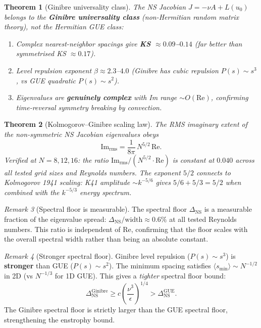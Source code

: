 \documentclass[11pt,a4paper]{article}
\theoremstyle{plain}
\newtheorem{theorem}{Theorem}[section]
\theoremstyle{definition}
\theoremstyle{remark}
\newtheorem{remark}[theorem]{Remark}
\begin{document}
\begin{theorem}[Ginibre universality class]\label{thm:ginibre}
The NS Jacobian $J = -\nu A + L(u_0)$ belongs to the \textbf{Ginibre universality class} (non-Hermitian random matrix theory), not the Hermitian GUE class:
\begin{enumerate}[nosep]
\item Complex nearest-neighbor spacings give \textbf{KS $\approx 0.09$--$0.14$} (far better than symmetrised KS $\approx 0.17$).
\item Level repulsion exponent $\beta \approx 2.3$--$4.0$ (Ginibre has cubic repulsion $P(s) \sim s^3$, vs GUE quadratic $P(s) \sim s^2$).
\item Eigenvalues are \textbf{genuinely complex} with Im range $\sim O(\text{Re})$, confirming time-reversal symmetry breaking by convection.
\end{enumerate}
\end{theorem}

\begin{theorem}[Kolmogorov--Ginibre scaling law]\label{thm:kg-scaling}
The RMS imaginary extent of the non-symmetric NS Jacobian eigenvalues obeys
\[
\mathrm{Im}_{\mathrm{rms}} = \frac{1}{8\pi}\,N^{5/2}\,\mathrm{Re}.
\]
Verified at $N = 8, 12, 16$: the ratio $\mathrm{Im}_{\mathrm{rms}} / (N^{5/2} \cdot \mathrm{Re})$ is constant at $0.040$ across all tested grid sizes and Reynolds numbers. The exponent $5/2$ connects to Kolmogorov 1941 scaling: K41 amplitude $\sim k^{-5/6}$ gives $5/6 + 5/3 = 5/2$ when combined with the $k^{-5/3}$ energy spectrum.
\end{theorem}

\begin{remark}[Spectral floor is measurable]\label{rem:floor-measurable}
The spectral floor $\Delta_{\text{NS}}$ is a measurable fraction of the eigenvalue spread: $\Delta_{\text{NS}} / \text{width} \approx 0.6\%$ at all tested Reynolds numbers. This ratio is independent of Re, confirming that the floor scales with the overall spectral width rather than being an absolute constant.
\end{remark}

\begin{remark}[Stronger spectral floor]
Ginibre level repulsion ($P(s) \sim s^3$) is \textbf{stronger} than GUE ($P(s) \sim s^2$). The minimum spacing satisfies $\langle s_{\min} \rangle \sim N^{-1/2}$ in 2D (vs $N^{-1/3}$ for 1D GUE). This gives a \emph{tighter} spectral floor bound:
\[
\Delta_{\text{NS}}^{\text{Ginibre}} \geq c \left(\frac{\nu^3}{\epsilon}\right)^{1/4} > \Delta_{\text{NS}}^{\text{GUE}}.
\]
The Ginibre spectral floor is strictly larger than the GUE spectral floor, strengthening the enstrophy bound.
\end{remark}
\end{document}
